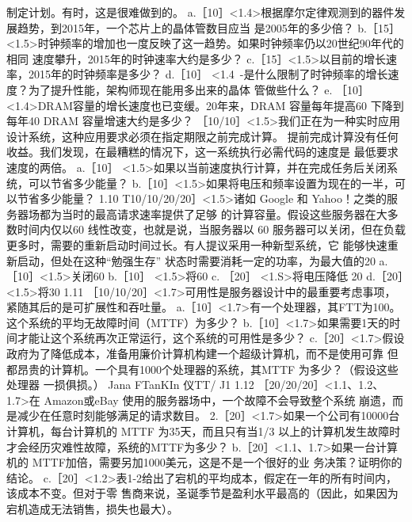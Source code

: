 制定计划。有时，这是很难做到的。
a.［10］<1.4>根据摩尔定律观测到的器件发展趋势，到2015年，一个芯片上的晶体管数目应当
是2005年的多少倍？
b.［15］<1.5>时钟频率的增加也一度反映了这一趋势。如果时钟频率仍以20世纪90年代的相同
速度攀升，2015年的时钟速率大约是多少？
c.［15］<1.5>以目前的增长速率，2015年的时钟频率是多少？
d.［10］ <1.4~-是什么限制了时钟频率的增长速度？为了提升性能，架构师现在能用多出来的晶体
管做些什么？
e. ［10］<1.4>DRAM容量的增长速度也已变缓。20年来，DRAM 容量每年提高60%
下降到每年40%
DRAM 容量增速大约是多少？
［10/10］<1.5>我们正在为一种实时应用设计系统，这种应用要求必须在指定期限之前完成计算。
提前完成计算没有任何收益。我们发现，在最糟糕的情况下，这一系统执行必需代码的速度是
最低要求速度的两倍。
a.［10］ <1.5>如果以当前速度执行计算，并在完成任务后关闭系统，可以节省多少能量？
b.［10］<1.5>如果将电压和频率设置为现在的一半，可以节省多少能量？
1.10
T10/10/20/20］<1.5>诸如 Google 和 Yahoo！之类的服务器场都为当时的最高请求速率提供了足够
的计算容量。假设这些服务器在大多数时间内仅以60%
线性改变，也就是说，当服务器以 60%
服务器可以关闭，但在负载更多时，需要的重新启动时间过长。有人提议采用一种新型系统，它
能够快速重新启动，但处在这种“勉强生存” 状态时需要消耗一定的功率，为最大值的20%
a.［10］<1.5>关闭60%
b.［10］ <1.5>将60%
c. ［20］ <1.S>将电压降低 20%
d.［20］<1.5>将30%
1.11
［10/10/20］<1.7>可用性是服务器设计中的最重要考虑事项，紧随其后的是可扩展性和吞吐量。
a.［10］<1.7>有一个处理器，其FTT为100。这个系统的平均无故障时间（MTTF）为多少？
b.［10］<1.7>如果需要1天的时间才能让这个系统再次正常运行，这个系统的可用性是多少？
c.［20］<1.7>假设政府为了降低成本，准备用廉价计算机构建一个超级计算机，而不是使用可靠
但都昂贵的计算机。一个具有1000个处理器的系统，其MTTF 为多少？（假设这些处理器
一损俱损。）
Jana FTanKIn 仪TT/
J1
1.12
［20/20/20］<1.1、1.2、1.7>在 Amazon或eBay 使用的服务器场中，一个故障不会导致整个系统
崩遗，而是减少在任意时刻能够满足的请求数目。
2.［20］<1.7>如果一个公司有10000台计算机，每台计算机的 MTTF 为35天，而且只有当1/3
以上的计算机发生故障时才会经历灾难性故障，系统的MTTF为多少？
b.［20］<1.1、1.7>如果一台计算机的 MTTF加倍，需要另加1000美元，这是不是一个很好的业
务决策？证明你的结论。
c.［20］<1.2>表1-2给出了宕机的平均成本，假定在一年的所有时间内，该成本不变。但对于零
售商来说，圣诞季节是盈利水平最高的（因此，如果因为宕机造成无法销售，损失也最大）。
